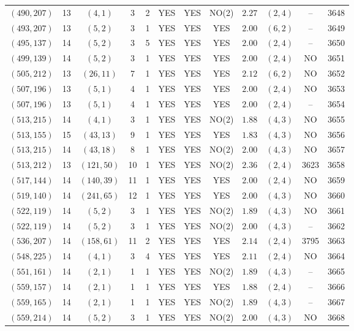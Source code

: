 \begin{longtable}{|c|c|c|c|c|c|c|c|c|c|c|c|}
$(490,207)$ & 13 & $(4,1)$ & 3 & 2 & YES & YES & NO(2) & $2.27$ & $(2,4)$ & -- & 3648\\
$(493,207)$ & 13 & $(5,2)$ & 3 & 1 & YES & YES & YES & $2.00$ & $(6,2)$ & -- & 3649\\
$(495,137)$ & 14 & $(5,2)$ & 3 & 5 & YES & YES & YES & $2.00$ & $(2,4)$ & -- & 3650\\
$(499,139)$ & 14 & $(5,2)$ & 3 & 1 & YES & YES & YES & $2.00$ & $(2,4)$ & NO & 3651\\
$(505,212)$ & 13 & $(26,11)$ & 7 & 1 & YES & YES & YES & $2.12$ & $(6,2)$ & NO & 3652\\
$(507,196)$ & 13 & $(5,1)$ & 4 & 1 & YES & YES & YES & $2.00$ & $(2,4)$ & NO & 3653\\
$(507,196)$ & 13 & $(5,1)$ & 4 & 1 & YES & YES & YES & $2.00$ & $(2,4)$ & -- & 3654\\
$(513,215)$ & 14 & $(4,1)$ & 3 & 1 & YES & YES & NO(2) & $1.88$ & $(4,3)$ & NO & 3655\\
$(513,155)$ & 15 & $(43,13)$ & 9 & 1 & YES & YES & YES & $1.83$ & $(4,3)$ & NO & 3656\\
$(513,215)$ & 14 & $(43,18)$ & 8 & 1 & YES & YES & NO(2) & $2.00$ & $(4,3)$ & NO & 3657\\
$(513,212)$ & 13 & $(121,50)$ & 10 & 1 & YES & YES & NO(2) & $2.36$ & $(2,4)$ & 3623 & 3658\\
$(517,144)$ & 14 & $(140,39)$ & 11 & 1 & YES & YES & YES & $2.00$ & $(2,4)$ & NO & 3659\\
$(519,140)$ & 14 & $(241,65)$ & 12 & 1 & YES & YES & YES & $2.00$ & $(4,3)$ & NO & 3660\\
$(522,119)$ & 14 & $(5,2)$ & 3 & 1 & YES & YES & NO(2) & $1.89$ & $(4,3)$ & NO & 3661\\
$(522,119)$ & 14 & $(5,2)$ & 3 & 1 & YES & YES & NO(2) & $2.00$ & $(4,3)$ & -- & 3662\\
$(536,207)$ & 14 & $(158,61)$ & 11 & 2 & YES & YES & YES & $2.14$ & $(2,4)$ & 3795 & 3663\\
$(548,225)$ & 14 & $(4,1)$ & 3 & 4 & YES & YES & YES & $2.11$ & $(2,4)$ & NO & 3664\\
$(551,161)$ & 14 & $(2,1)$ & 1 & 1 & YES & YES & NO(2) & $1.89$ & $(4,3)$ & -- & 3665\\
$(559,157)$ & 14 & $(2,1)$ & 1 & 1 & YES & YES & YES & $1.88$ & $(2,4)$ & -- & 3666\\
$(559,165)$ & 14 & $(2,1)$ & 1 & 1 & YES & YES & NO(2) & $1.89$ & $(4,3)$ & -- & 3667\\
$(559,214)$ & 14 & $(5,2)$ & 3 & 1 & YES & YES & NO(2) & $2.00$ & $(4,3)$ & NO & 3668\\

\end{longtable}
